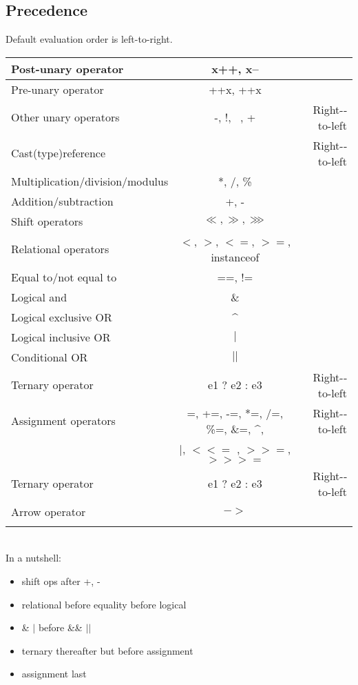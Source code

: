 \documentclass{scrartcl}
\begin{document}
\subsection{Precedence}

    Default evaluation order is left-to-right.

    \begin{tabular}{|l|c|r|}
        \hline
        Post-­unary operator& x++, x-- &  \\
        \hline
        Pre-­unary operator& ++x, ++x &  \\
        \hline
        Other unary operators& -­, !, ~, + &  Right-­to-­left \\
        \hline
        Cast(type)reference&  &  Right-­to-­left \\
        \hline
        Multiplication/division/modulus& *, /, \% &  \\
        \hline
        Addition/subtraction& +, - &  \\
        \hline
        Shift operators& $\ll, \gg, \ggg$ &  \\
        \hline
        Relational operators & $<$, $>$, $<=$, $>=$, instanceof & \\
        \hline
        Equal to/not equal to& ==, != &\\
        \hline
        Logical and& \& &  \\
        \hline
        Logical exclusive OR& \textasciicircum \\
        \hline
        Logical inclusive OR& $|$ &  \\
        \hline
        Conditional OR& $||$ &  \\
        \hline
        Ternary operator& e1 ? e2 : e3 & Right-­to-­left\\
        \hline
        Assignment operators& =, +=, -­=, *=, /=, \%=, \&=, \textasciicircum, & Right-­to-­left\\
        & $|$, $<<=$ , $>>=$, $>>>=$ & \\
        \hline
        Ternary operator& e1 ? e2 : e3 & Right-­to-­left\\
        \hline
        Arrow operator& $->$ &  \\\\
        \hline
    \end{tabular}
     \\

    In a nutshell:

    \begin{itemize}
        \item shift ops after +, -
        \item relational before equality before logical
        \item \& $|$ before \&\& $||$
        \item ternary thereafter but before assignment
        \item assignment last
    \end{itemize}
\end{document}
